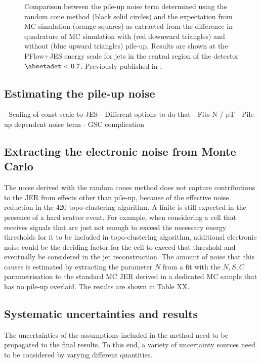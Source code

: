 \begin{figure}[t]
    \caption{Comparison between the pile-up noise term \Npileup determined using the random cone method (black solid circles) and the expectation from MC simulation (orange squares) as extracted from the difference in quadrature of MC simulation with (red downward triangles) and without (blue upward triangles) pile-up. Results are shown at the PFlow+JES energy scale for jets in the central region of the detector $\absetadet < 0.7$. Previously published in .}
    \label{fig:non-closure}
\end{figure}


\subsection{Estimating the pile-up noise}
- Scaling of const scale to JES
- Different options to do that
- Fits N / pT 
- Pile-up dependent noise term 
- GSC complication


\subsection{Extracting the electronic noise from Monte Carlo}
The noise derived with the random cones method does not capture contributions to the JER from effects other than pile-up, because of the effective noise reduction in the 420 topo-clustering algorithm. A finite \Nmuzero is still expected in the presence of a hard scatter event.
For example, when considering a cell that receives signals that are just not enough to exceed the necessary energy thresholds for it to be included in topo-clustering algorithm, additional electronic noise could be the deciding factor for the cell to exceed that threshold and eventually be considered in the jet reconstruction.
The amount of noise that this causes is estimated by extracting the parameter $N$ from a fit with the $N, S, C$ parametrisation to the standard MC JER derived in a dedicated MC sample that has no pile-up overlaid.
The results are shown in Table XX.


\subsection{Systematic uncertainties and results}
The uncertainties of the assumptions included in the method need to be propagated to the final results. To this end, a variety of uncertainty sources need to be considered by varying different quantities. 


